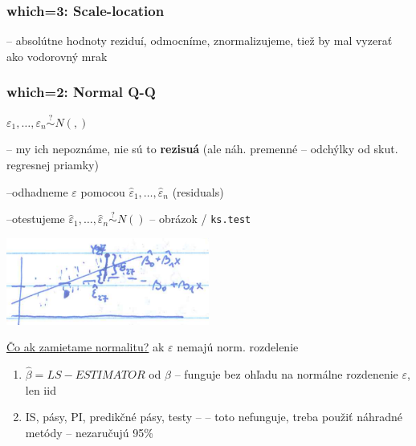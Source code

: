 \documentclass[unknownkeysallowed]{article}
\begin{document}
\subsubsection*{which=3: Scale-location}
-- absolútne hodnoty reziduí, odmocníme, znormalizujeme, tiež by mal vyzerať ako vodorovný mrak

\subsubsection*{which=2: Normal Q-Q}

\begin{multicols}{2}

$\varepsilon_1, \ldots, \varepsilon_n \overset{?}{\sim} N(,)$

-- my ich nepoznáme, nie sú to \textbf{rezisuá} (ale náh. premenné -- odchýlky od skut. regresnej priamky)

--odhadneme $\varepsilon$ pomocou $\hat{\varepsilon}_1, \ldots, \hat{\varepsilon}_n$ (residuals)

--otestujeme $\hat{\varepsilon}_1, \ldots, \hat{\varepsilon}_n \overset{?}{\sim} N()$ -- obrázok / \texttt{ks.test}

\columnbreak

\includegraphics[width=0.5\textwidth]{imgs/obr36.png}

\end{multicols}

\underline{Čo ak zamietame normalitu?} ak $\varepsilon$ nemajú norm. rozdelenie
\begin{enumerate}
\item $\hat{\beta} = LS-ESTIMATOR$ od $\beta$ \checkmark -- funguje bez ohľadu na normálne rozdenenie $\varepsilon$, len iid
\item IS, pásy, PI, predikčné pásy, testy -- \texttimes -- toto nefunguje, treba použiť náhradné metódy -- nezaručujú 95\%
\end{enumerate}
\end{document}

